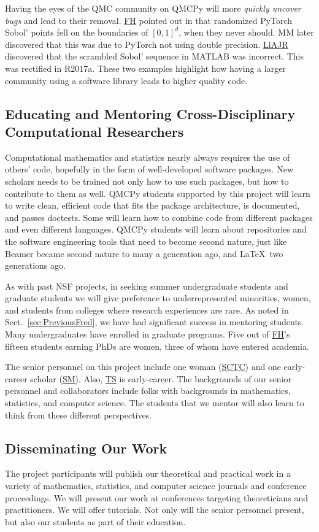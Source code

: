 \documentclass[11pt]{NSFamsart}
\newcommand{\FH}{\hyperlink{FHlink}{FH}\xspace}
\newcommand{\SM}{\hyperlink{SMlink}{SM}\xspace}
\newcommand{\SCTC}{\hyperlink{SCTClink}{SCTC}\xspace}
\newcommand{\TS}{\hyperlink{TSlink}{TS}\xspace}
\newcommand{\LlAJR}{\hyperlink{LlAJRlink}{LlAJR}\xspace}
\begin{document}
Having the eyes of the QMC community on QMCPy will more \emph{quickly uncover bugs} and lead to their removal.  \FH  pointed out in \cite{PyTorchFirstPt2020a} that randomized PyTorch Sobol' points fell on the boundaries of $[0,1]^d$, when they never should.  MM later discovered that this was due to PyTorch not using double precision.  \LlAJR discovered that the scrambled Sobol' sequence in MATLAB was incorrect.  This was rectified in R2017a.  These two examples highlight how having a larger community using a software library leads to higher quality code.

\subsection{Educating and Mentoring Cross-Disciplinary Computational Researchers}
Computational mathematics and statistics nearly always requires the use of others' code, hopefully in the form of well-developed software packages.  New scholars needs to be trained not only how to use such packages, but how to contribute to them as well.  QMCPy students supported by this project will learn to write clean, efficient code that fits the package architecture, is documented, and passes doctests.  Some will learn how to combine code from different packages and even different languages.  QMCPy students will learn about repositories and the software engineering tools that need to become second nature, just like Beamer became second nature to many a generation ago, and \LaTeX\ two generations ago.

As with past NSF projects, in seeking summer undergraduate students and graduate students we will give preference to underrepresented minorities, women, and students from colleges where research experiences are rare.  As noted in Sect.\ \ref{sec:PreviousFred}, we have had significant success in mentoring students.  Many undergraduates have enrolled in graduate programs.  Five out of \FH's fifteen students earning PhDs are women, three of whom have entered academia.

The senior personnel on this project include one woman (\SCTC) and one early-career scholar (\SM).  Also, \TS is early-career.  The backgrounds of our senior personnel and collaborators include folks with backgrounds in mathematics, statistics, and computer science.  The students  that we mentor will also learn to think from these different perspectives.

\subsection{Disseminating Our Work} The project participants will publish our theoretical and practical work in a variety of mathematics, statistics, and computer science journals and conference proceedings. We will present our work at conferences targeting theoreticians and practitioners.  We will offer tutorials.  Not only will the senior personnel present, but also our students as part of their education.
\end{document}
